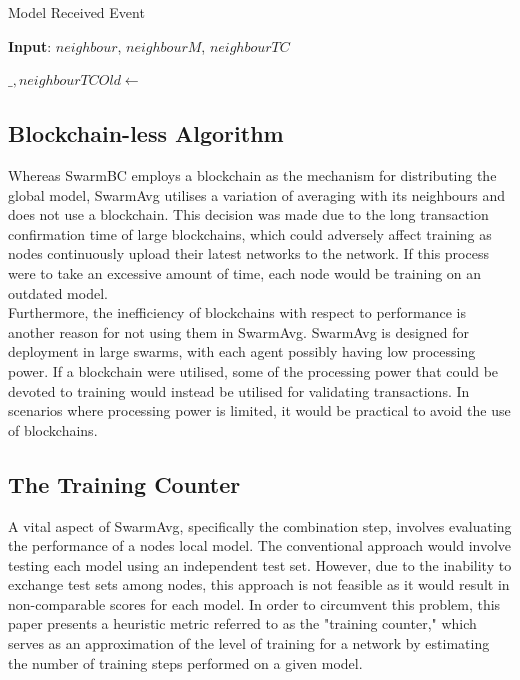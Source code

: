 \documentclass[letterpaper, 10 pt, conference]{ieeeconf}  %
\begin{document}
\begin{algorithm}[H]
	\caption{Model Received Event} \label{cachealgo}
	\textbf{Input}: $neighbour$, $neighbourM$, $neighbourTC$
	\newline
	\begin{algorithmic}[1]
		\State $\_, neighbourTCOld \gets$ 
		\State {}
		\EndIf
		\Else
		\State {}
		\EndIf
	\end{algorithmic}
\end{algorithm}

\subsection{Blockchain-less Algorithm}
Whereas SwarmBC employs a blockchain as the mechanism for distributing the global model, SwarmAvg utilises a variation of averaging with its neighbours and does not use a blockchain. This decision was made due to the long transaction confirmation time of large blockchains, which could adversely affect training as nodes continuously upload their latest networks to the network. If this process were to take an excessive amount of time, each node would be training on an outdated model. \\

Furthermore, the inefficiency of blockchains with respect to performance is another reason for not using them in SwarmAvg. SwarmAvg is designed for deployment in large swarms, with each agent possibly having low processing power. If a blockchain were utilised, some of the processing power that could be devoted to training would instead be utilised for validating transactions. In scenarios where processing power is limited, it would be practical to avoid the use of blockchains.

\subsection{The Training Counter}
A vital aspect of SwarmAvg, specifically the combination step, involves evaluating the performance of a nodes local model. The conventional approach would involve testing each model using an independent test set. However, due to the inability to exchange test sets among nodes, this approach is not feasible as it would result in non-comparable scores for each model. In order to circumvent this problem, this paper presents a heuristic metric referred to as the "training counter," which serves as an approximation of the level of training for a network by estimating the number of training steps performed on a given model. \\
\end{document}
